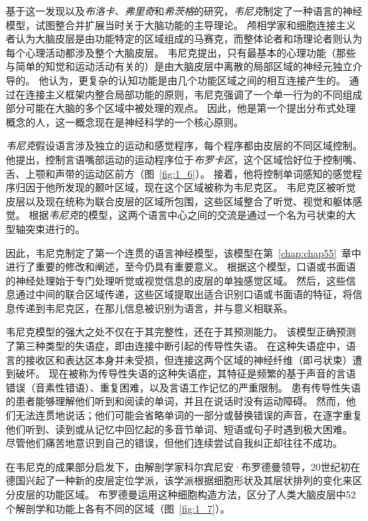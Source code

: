基于这一发现以及\textit{布洛卡}、\textit{弗里奇}和\textit{希茨格}的研究，\textit{韦尼克}制定了一种语言的神经模型，试图整合并扩展当时关于大脑功能的主导理论。
颅相学家和细胞连接主义者认为大脑皮层是由功能特定的区域组成的马赛克，而整体论者和场理论者则认为每个心理活动都涉及整个大脑皮层。
韦尼克提出，只有最基本的心理功能（那些与简单的知觉和运动活动有关的）是由大脑皮层中离散的局部区域的神经元独立介导的。
他认为，更复杂的认知功能是由几个功能区域之间的相互连接产生的。
通过在连接主义框架内整合局部功能的原则，韦尼克强调了一个单一行为的不同组成部分可能在大脑的多个区域中被处理的观点。
因此，他是第一个提出分布式处理概念的人，这一概念现在是神经科学的一个核心原则。




\textit{韦尼克}假设语言涉及独立的运动和感觉程序，每个程序都由皮层的不同区域控制。
他提出，控制言语嘴部运动的运动程序位于\textit{布罗卡区}，这个区域恰好位于控制嘴、舌、上颚和声带的运动区前方（图~\ref{fig:1_6}）。
接着，他将控制单词感知的感觉程序归因于他所发现的颞叶区域，现在这个区域被称为韦尼克区。
韦尼克区被听觉皮层以及现在统称为联合皮层的区域所包围，这些区域整合了听觉、视觉和躯体感觉。
根据\textit{韦尼克}的模型，这两个语言中心之间的交流是通过一个名为弓状束的大型轴突束进行的。



因此，韦尼克制定了第一个连贯的语言神经模型，该模型在第~\ref{chap:chap55}~章中进行了重要的修改和阐述，至今仍具有重要意义。
根据这个模型，口语或书面语的神经处理始于专门处理听觉或视觉信息的皮层的单独感觉区域。
然后，这些信息通过中间的联合区域传递，这些区域提取出适合识别口语或书面语的特征，将信息传递到韦尼克区，在那儿信息被识别为语言，并与意义相联系。




韦尼克模型的强大之处不仅在于其完整性，还在于其预测能力。
该模型正确预测了第三种类型的失语症，即由连接中断引起的传导性失语。
在这种失语症中，语言的接收区和表达区本身并未受损，但连接这两个区域的神经纤维（即弓状束）遭到破坏。
现在被称为传导性失语的这种失语症，其特征是频繁的基于声音的言语错误（音素性错语）、重复困难，以及言语工作记忆的严重限制。
患有传导性失语的患者能够理解他们听到和阅读的单词，并且在说话时没有运动障碍。
然而，他们无法连贯地说话；他们可能会省略单词的一部分或替换错误的声音，在逐字重复他们听到、读到或从记忆中回忆起的多音节单词、短语或句子时遇到极大困难。
尽管他们痛苦地意识到自己的错误，但他们连续尝试自我纠正却往往不成功。





在韦尼克的成果部分启发下，由解剖学家科尔宾尼安·布罗德曼领导，20世纪初在德国兴起了一种新的皮层定位学派，该学派根据细胞形状及其层状排列的变化来区分皮层的功能区域。
布罗德曼运用这种细胞构造方法，区分了人类大脑皮层中52个解剖学和功能上各有不同的区域（图~\ref{fig:1_7}）。




